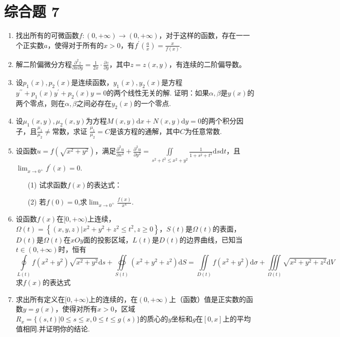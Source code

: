 \section{综合题 7}
\begin{enumerate}
	\item 找出所有的可微函数$f :(0,+\infty) \rightarrow(0,+\infty)$，对于这样的函数，存在一一个正实数$a$，使得对于所有的$x>0$，有$f^{\prime}\left(\frac{a}{x}\right)=\frac{x}{f(x)}$.
	
	\item 解二阶偏微分方程$\frac{\partial^{2} z}{\partial x \partial y}=\frac{1}{2 x} \cdot \frac{\partial z}{\partial y}$，其中$z=z(x,y)$，有连续的二阶偏导数。
	\item 设$p_{1}(x), p_{2}(x)$是连续函数，$y_{1}(x), y_{2}(x)$是方程$y^{\prime \prime}+p_{1}(x) y^{\prime}+p_{2}(x) y=0$的两个线性无关的解.
	证明：如果$\alpha,\beta$是$y(x)$的两个零点，则在$\alpha,\beta$之间必存在$y_{2}(x)$的一个零点.
	\item 设$\mu_{1}(x, y), \mu_{2}(x, y)$为方程$M(x, y) \mathrm{d} x+N(x, y) \mathrm{d} y=0$的两个积分因子，且$\frac{\mu_{1}}{\mu_{2}} \neq$常数，求证
	$\frac{\mu_{1}}{\mu_{2}}=C$是该方程的通解，其中$C$为任意常数.
	\item 设函数$u=f\left(\sqrt{x^{2}+y^{2}}\right)$，满足$\frac{\partial^{2} u}{\partial x^{2}}+\frac{\partial^{2} u}{\partial y^{2}}=\iint\limits_{s^{2}+t^{2} \leqslant x^{2}+y^{2}} \frac{1}{1+s^{2}+t^{2}} \mathrm{d} s \mathrm{d} t$，且$\lim _{x \rightarrow 0^{+}} f^{\prime}(x)=0$.
	\begin{enumerate}
		\item [(1)]试求函数$f(x)$的表达式：
		\item [(2)]若$f(0)=0$,求$\lim _{x \rightarrow 0^{+}} \frac{f(x)}{x^{4}}$.
	\end{enumerate}
	\item 设函数$f(x)$在$[0,+\infty)$上连续，$\Omega(t)=\left\{(x, y, z) | x^{2}+y^{2}+z^{2} \leqslant t^{2}, z \geqslant 0\right\}$，$S(t)$是$\Omega(t)$的表面，$D(t)$是$\Omega(t)$在$xOy$面的投影区域，$L(t)$是$D(t)$的边界曲线，已知当$t \in(0,+\infty)$时，恒有
	\[\oint\limits_{L(t)} f\left(x^{2}+y^{2}\right) \sqrt{x^{2}+y^{2}} \mathrm{d} s+\oiint\limits_{S(t)}\left(x^{2}+y^{2}+z^{2}\right) \mathrm{d} S=\iint\limits_{D(t)} f\left(x^{2}+y^{2}\right) \mathrm{d} \sigma+\iiint\limits_{\Omega(t)} \sqrt{x^{2}+y^{2}+z^{2}} \mathrm{d} V\]
	求$f(x)$的表达式
	\item 求出所有定义在$[0,+\infty)$上的连续的，在$(0,+\infty)$上（函数）值是正实数的函数$y=g(x)$，使得对所有$x>0$，区域$R_{x}=\{(s, t) | 0 \leqslant s \leqslant x, 0 \leqslant t \leqslant g(s)\}$的质心的$y$坐标和$g$在$[0,x]$上的平均值相同.并证明你的结论.
	

\end{enumerate}
